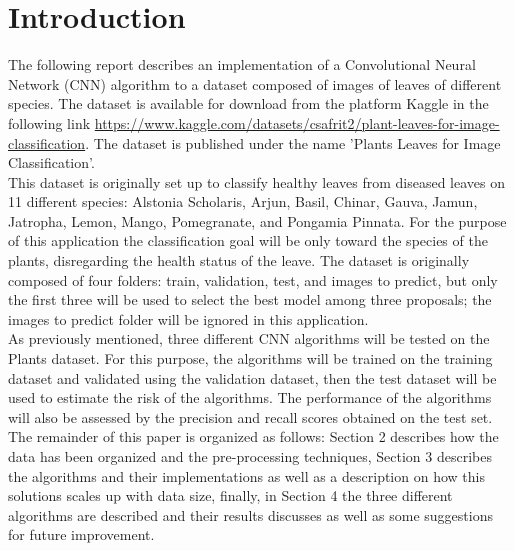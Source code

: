 \documentclass[11pt]{article}
\begin{document}

\tableofcontents

\clearpage

\section{Introduction} \label{Section1}
The following report describes an implementation of a Convolutional Neural Network (CNN) algorithm to a dataset composed of images of leaves of different species. The dataset is available for download from the platform Kaggle in the following link \url{https://www.kaggle.com/datasets/csafrit2/plant-leaves-for-image-classification}. The dataset is published under the name 'Plants Leaves for Image Classification'.\\

This dataset is originally set up to classify healthy leaves from diseased leaves on 11 different species: Alstonia Scholaris, Arjun, Basil, Chinar, Gauva, Jamun, Jatropha, Lemon, Mango, Pomegranate, and Pongamia Pinnata. For the purpose of this application the classification goal will be only toward the species of the plants, disregarding the health status of the leave. The dataset is originally composed of four folders: train, validation, test, and images to predict, but only the first three will be used to select the best model among three proposals; the images to predict folder will be ignored in this application.\\

As previously mentioned, three different CNN algorithms will be tested on the Plants dataset. For this purpose, the algorithms will be trained on the training dataset and validated using the validation dataset, then the test dataset will be used to estimate the risk of the algorithms. The performance of the algorithms will also be assessed by the precision and recall scores obtained on the test set. The remainder of this paper is organized as follows: Section 2 describes how the data has been organized and the pre-processing techniques, Section 3 describes the algorithms and their implementations as well as a description on how this solutions scales up with data size, finally, in Section 4 the three different algorithms are described and their results discusses as well as some suggestions for future improvement.\\
\end{document}
